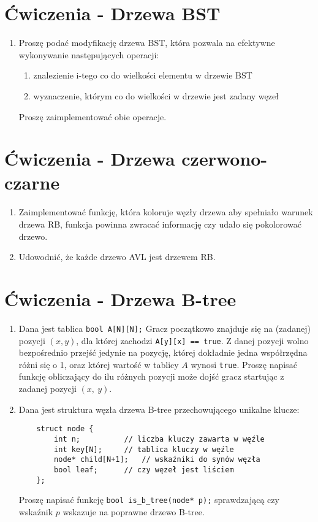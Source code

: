 \documentclass[11pt]{article}
\begin{document}
\section{Ćwiczenia - Drzewa BST}

\begin{enumerate}
	
	\item Proszę podać modyfikację drzewa BST, która pozwala na efektywne
	wykonywanie następujących operacji:
	\begin{enumerate}
		\item znalezienie i-tego co do wielkości elementu w drzewie BST
		\item wyznaczenie, którym co do wielkości w drzewie jest zadany węzeł
	\end{enumerate}
	Proszę zaimplementować obie operacje.
	
\end{enumerate}
\section{Ćwiczenia - Drzewa czerwono-czarne}

\begin{enumerate}
	
	\item Zaimplementować funkcję, która koloruje węzły drzewa aby spełniało warunek drzewa RB,
	funkcja powinna zwracać informację czy udało się pokolorować drzewo.
	\item Udowodnić, że każde drzewo AVL jest drzewem RB.
	
\end{enumerate}
\section{Ćwiczenia - Drzewa B-tree}

\begin{enumerate}
	
	\item Dana jest tablica \texttt{bool A[N][N];} Gracz początkowo znajduje się na (zadanej) pozycji $(x, y)$,
	dla której zachodzi \texttt{A[y][x] == true}. Z danej pozycji wolno bezpośrednio przejść jedynie na pozycję,
	której dokładnie jedna współrzędna różni się o 1, oraz której wartość w tablicy $A$ wynosi \texttt{true}.
	Proszę napisać funkcję obliczający do ilu różnych pozycji może dojść gracz startując z zadanej pozycji $(x,~y)$.
	
	\item Dana jest struktura węzła drzewa B-tree przechowującego unikalne klucze: \newline
\begin{lstlisting}
	struct node {
		int n;			// liczba kluczy zawarta w węźle
		int key[N];		// tablica kluczy w węźle
		node* child[N+1];	// wskaźniki do synów węzła
		bool leaf;		// czy węzeł jest liściem
	};
\end{lstlisting}

	Proszę napisać funkcję \texttt{bool is\_b\_tree(node* p);} sprawdzającą czy
	wskaźnik $p$ wskazuje na poprawne drzewo B-tree.
	
	
\end{enumerate}
\end{document}
